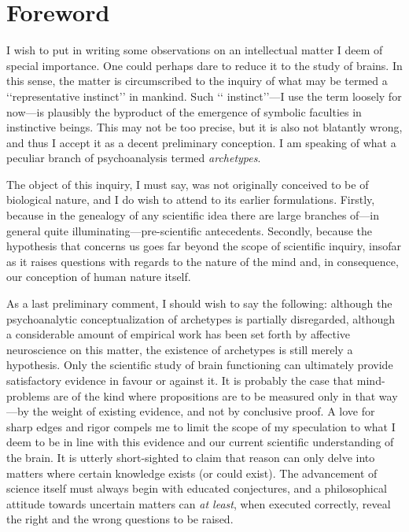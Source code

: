 \documentclass[a4paper]{article}
\begin{document}
    \section{Foreword}

    I wish to put in writing some observations on an intellectual matter I deem
    of special importance. One could perhaps dare to reduce it to the study of
    brains. In this sense, the matter is circumscribed to the inquiry of what may be
    termed a \lq\lq representative instinct\rq\rq{} in mankind. Such \lq\lq
    instinct\rq\rq{}---I use the term loosely for now---is plausibly the
    byproduct of the emergence of symbolic faculties in instinctive beings.
    This may not be too precise, but it is also not blatantly wrong, and thus I
    accept it as a decent preliminary conception. I am speaking of what a
    peculiar branch of psychoanalysis termed \textit{archetypes}.

    The object of this inquiry, I must say, was not originally conceived to be of
    biological nature, and I do wish to attend to its earlier formulations.
    Firstly, because in the genealogy of any scientific idea there are large
    branches of---in general quite illuminating---pre-scientific antecedents.
    Secondly, because the hypothesis that concerns us goes far beyond the scope of
    scientific inquiry, insofar as it raises questions with regards to
    the nature of the mind and, in consequence, our conception of human nature
    itself.

    As a last preliminary comment, I should wish to say the following: although
    the psychoanalytic conceptualization of archetypes is partially disregarded,
    although a considerable amount of empirical work has been set forth by
    affective neuroscience on this matter, the existence of archetypes is still
    merely a hypothesis. Only the scientific study of brain functioning can
    ultimately provide satisfactory evidence in favour or against it. It is
    probably the case that mind-problems are of the kind where propositions are
    to be measured only in that way---by the weight of existing evidence, and not
    by conclusive proof. A love for sharp edges and rigor compels me to limit
    the scope of my speculation to what I deem to be in line with this
    evidence and our current scientific understanding of the brain. It is
    utterly short-sighted to claim that reason can only delve into matters where
    certain knowledge exists (or could exist). The advancement of science itself
    must always begin with educated conjectures, and a philosophical attitude
    towards uncertain matters can \textit{at least}, when executed correctly,
    reveal the right and the wrong questions to be raised.
\end{document}
